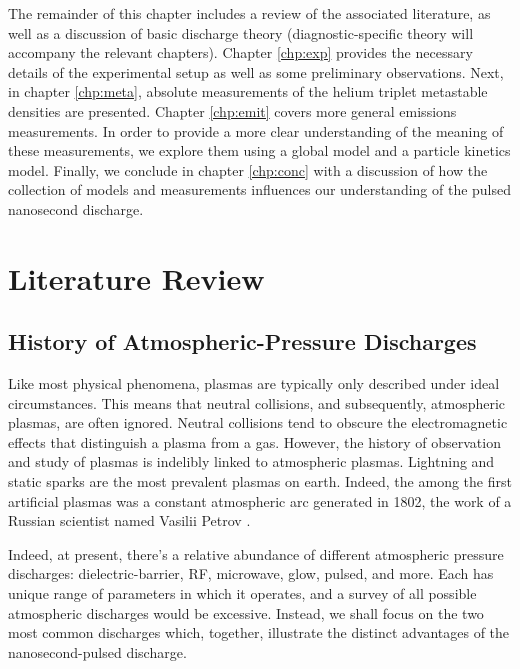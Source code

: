 The remainder of this chapter includes a review of the associated literature, as
well as a discussion of basic discharge theory (diagnostic-specific theory will
accompany the relevant chapters). Chapter \ref{chp:exp} provides the necessary
details of the experimental setup as well as some preliminary observations.
Next, in chapter \ref{chp:meta}, absolute measurements of the helium triplet
metastable densities are presented. Chapter \ref{chp:emit} covers more general
emissions measurements. In order to provide a more clear understanding of the
meaning of these measurements, we explore them using a global model and a
particle kinetics model. Finally, we conclude in chapter \ref{chp:conc} with a
discussion of how the collection of models and measurements influences our
understanding of the pulsed nanosecond discharge.

\section{Literature Review}

\subsection{History of Atmospheric-Pressure Discharges}


Like most physical phenomena, plasmas are typically only described under ideal
circumstances. This means that neutral collisions, and subsequently, atmospheric
plasmas, are often ignored. Neutral collisions tend to obscure the
electromagnetic effects that distinguish a plasma from a gas. However, the
history of observation and study of plasmas is indelibly linked to atmospheric
plasmas. Lightning and static sparks are the most prevalent plasmas on earth. 
Indeed, the among the first artificial plasmas was a constant atmospheric arc
generated in 1802, the work of a Russian scientist named Vasilii Petrov
\cite{Anders2003}.

Indeed, at present, there's a relative abundance of different
atmospheric pressure discharges: dielectric-barrier, RF, microwave, glow,
pulsed, and more. Each has unique range of parameters in which it operates, and
a survey of all possible atmospheric discharges would be excessive. Instead, we
shall focus on the two most common discharges which, together, illustrate the
distinct advantages of the nanosecond-pulsed discharge.

